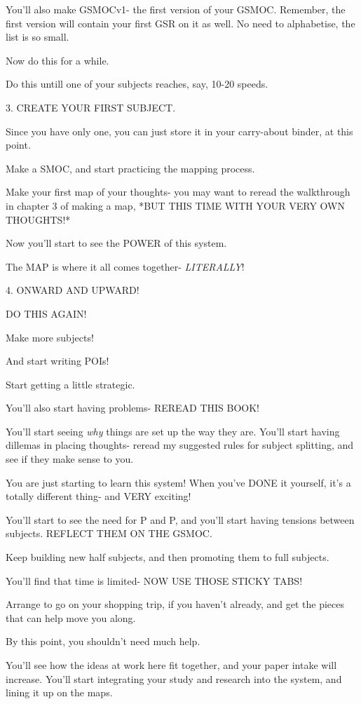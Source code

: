 \documentclass[oneside]{book}
\begin{document}
You'll also make GSMOCv1- the first version of your GSMOC. Remember,
the first version will contain your first GSR on it as well. No need
to alphabetise, the list is so small.

Now do this for a while.

Do this untill one of your subjects reaches, say, 10-20 speeds.

3. CREATE YOUR FIRST SUBJECT.

Since you have only one, you can just store it in your carry-about
binder, at this point.

Make a SMOC, and start practicing the mapping process.

Make your first map of your thoughts- you may want to reread the
walkthrough in chapter 3 of making a map, *BUT THIS TIME WITH YOUR
VERY OWN THOUGHTS!*

Now you'll start to see the POWER of this system.

The MAP is where it all comes together- \emph{LITERALLY}!

4. ONWARD AND UPWARD!

DO THIS AGAIN!

Make more subjects!

And start writing POIs!

Start getting a little strategic.

You'll also start having problems- REREAD THIS BOOK!

You'll start seeing \emph{why} things are set up the way they are. You'll
start having dillemas in placing thoughts- reread my suggested rules
for subject splitting, and see if they make sense to you.

You are just starting to learn this system! When you've DONE it
yourself, it's a totally different thing- and VERY exciting!

You'll start to see the need for P and P, and you'll start having tensions
between subjects. REFLECT THEM ON THE GSMOC.

Keep building new half subjects, and then promoting them to full
subjects.

You'll find that time is limited- NOW USE THOSE STICKY TABS!

Arrange to go on your shopping trip, if you haven't already, and get
the pieces that can help move you along.

By this point, you shouldn't need much help.

You'll see how the ideas at work here fit together, and your paper
intake will increase. You'll start integrating your study and research
into the system, and lining it up on the maps.
\end{document}
